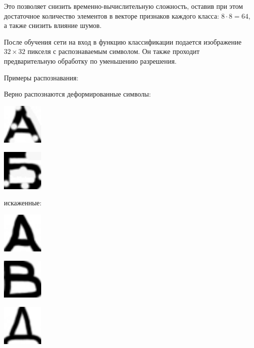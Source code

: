 Это позволяет снизить временно-вычислительную сложность, оставив при этом достаточное количество элементов в векторе признаков каждого класса: $8 \cdot 8 = 64$, а также снизить влияние шумов.

После обучения сети на вход в функцию классификации подается изображение $32\times 32$ пикселя с распознаваемым символом. Он также проходит предварительную обработку по уменьшению разрешения.

Примеры распознавания:

Верно распознаются деформированные символы:
\begin{center}
	\includegraphics[width=2cm]{image_for_report/sample_a.jpg}
\end{center}
\begin{center}
	\includegraphics[width=2cm]{image_for_report/sample_b_2.jpg}
\end{center}

искаженные:
\begin{center}
	\includegraphics[width=2cm]{image_for_report/sample_a_2.jpg}
\end{center}

\begin{center}
	\includegraphics[width=2cm]{image_for_report/sample_v_2.jpg}
\end{center}

\begin{center}
	\includegraphics[width=2cm]{image_for_report/sample_d.jpg}
\end{center}

